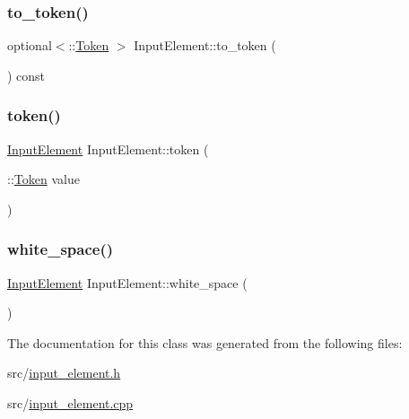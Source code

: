 \mbox{\label{class_input_element_af042668baf6daacc5cfdc4d488ca2bbc}} 
\subsubsection{\texorpdfstring{to\+\_\+token()}{to\_token()}}
{\footnotesize\ttfamily optional$<$\+::\hyperlink{class_token}{Token} $>$ Input\+Element\+::to\+\_\+token (\begin{DoxyParamCaption}{ }\end{DoxyParamCaption}) const}

\mbox{\label{class_input_element_a6ecb5790fd45cd8f8492fa8b4011b817}} 
\subsubsection{\texorpdfstring{token()}{token()}}
{\footnotesize\ttfamily \hyperlink{class_input_element}{Input\+Element} Input\+Element\+::token (\begin{DoxyParamCaption}\item[{\+::\hyperlink{class_token}{Token}}]{value }\end{DoxyParamCaption})\hspace{0.3cm}{\ttfamily [static]}}

\mbox{\label{class_input_element_a06304c0e0c45b213946409300d3fa29b}} 
\subsubsection{\texorpdfstring{white\+\_\+space()}{white\_space()}}
{\footnotesize\ttfamily \hyperlink{class_input_element}{Input\+Element} Input\+Element\+::white\+\_\+space (\begin{DoxyParamCaption}{ }\end{DoxyParamCaption})\hspace{0.3cm}{\ttfamily [static]}}



The documentation for this class was generated from the following files\+:\begin{DoxyCompactItemize}
\item 
src/\hyperlink{input__element_8h}{input\+\_\+element.\+h}\item 
src/\hyperlink{input__element_8cpp}{input\+\_\+element.\+cpp}\end{DoxyCompactItemize}
